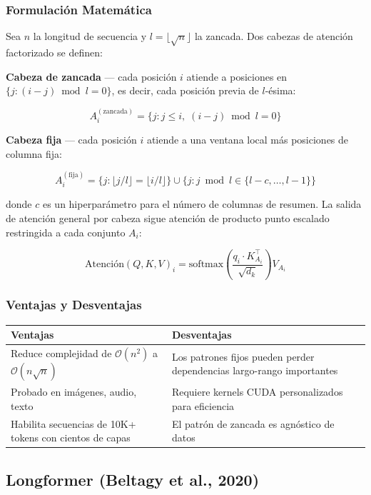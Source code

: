 \documentclass[11pt,a4paper]{article}
\begin{document}
\subsubsection{Formulación Matemática}

Sea $n$ la longitud de secuencia y $l = \lfloor\sqrt{n}\rfloor$ la zancada. Dos cabezas de atención factorizado se definen:

\textbf{Cabeza de zancada} — cada posición $i$ atiende a posiciones en $\{j : (i - j) \bmod l = 0\}$, es decir, cada posición previa de $l$-ésima:

$$
A_i^{(\text{zancada})} = \{j : j \leq i,\; (i - j) \bmod l = 0\}
$$

\textbf{Cabeza fija} — cada posición $i$ atiende a una ventana local más posiciones de columna fija:

$$
A_i^{(\text{fija})} = \{j : \lfloor j/l \rfloor = \lfloor i/l \rfloor\} \cup \{j : j \bmod l \in \{l{-}c, \ldots, l{-}1\}\}
$$

donde $c$ es un hiperparámetro para el número de columnas de resumen. La salida de atención general por cabeza sigue atención de producto punto escalado restringida a cada conjunto $A_i$:

$$
\text{Atención}(Q, K, V)_i = \text{softmax}\!\left(\frac{q_i \cdot K_{A_i}^\top}{\sqrt{d_k}}\right) V_{A_i}
$$

\subsubsection{Ventajas y Desventajas}

\begin{tabular}{|p{4cm}|p{4cm}|}
\hline
\textbf{Ventajas} & \textbf{Desventajas} \\
\hline
Reduce complejidad de $\mathcal{O}(n^2)$ a $\mathcal{O}(n\sqrt{n})$ & Los patrones fijos pueden perder dependencias largo-rango importantes \\
Probado en imágenes, audio, texto & Requiere kernels CUDA personalizados para eficiencia \\
Habilita secuencias de 10K+ tokens con cientos de capas & El patrón de zancada es agnóstico de datos \\
\hline
\end{tabular}

\subsection{Longformer (Beltagy et al., 2020)}
\end{document}
